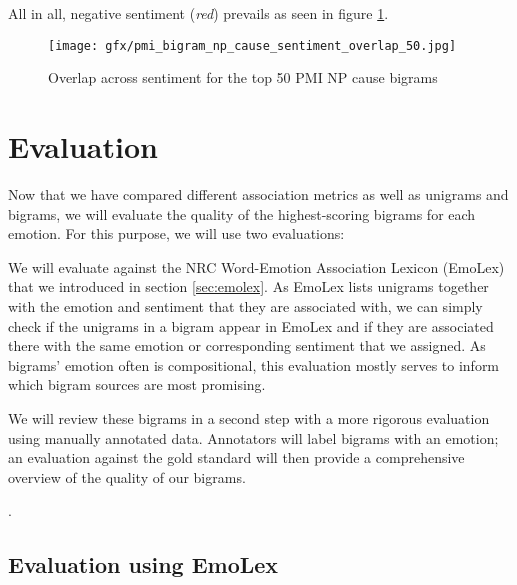 All in all, negative sentiment (\textit{red}) prevails as seen in figure \ref{fig:pmi-bigram-np-cause-sentiment-overlap-50}.

\begin{figure}[bth]
\texttt{[image: gfx/pmi\_bigram\_np\_cause\_sentiment\_overlap\_50.jpg]}
\caption{Overlap across sentiment for the top 50 PMI NP cause bigrams}\label{fig:pmi-bigram-np-cause-sentiment-overlap-50}
\end{figure}

\section{Evaluation}

Now that we have compared different association metrics as well as unigrams and bigrams, we will evaluate the quality of the highest-scoring bigrams for each emotion. For this purpose, we will use two evaluations:

\begin{aenumerate}
	\item We will evaluate against the NRC Word-Emotion Association Lexicon (EmoLex) \cite{nrc_emolex} that we introduced in section \ref{sec:emolex}. As EmoLex lists unigrams together with the emotion and sentiment that they are associated with, we can simply check if the unigrams in a bigram appear in EmoLex and if they are associated there with the same emotion or corresponding sentiment that we assigned. As bigrams' emotion often is compositional, this evaluation mostly serves to inform which bigram sources are most promising.
	\item We will review these bigrams in a second step with a more rigorous evaluation using manually annotated data. Annotators will label bigrams with an emotion; an evaluation against the gold standard will then provide a comprehensive overview of the quality of our bigrams.
\end{aenumerate}.

\subsection{Evaluation using EmoLex} \label{sec:emolex-evaluation}

